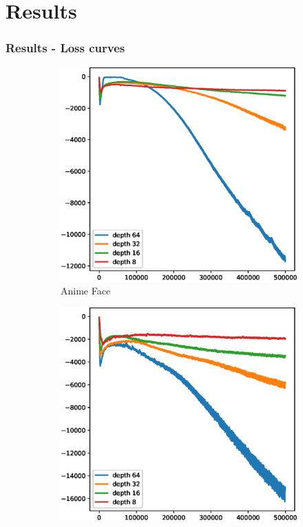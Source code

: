 \section{Results}

\begin{frame}
    \frametitle{Results - Loss curves}

    \begin{center}
        
        \begin{figure}[H]
            \centering
            \begin{subfigure}[b]{0.45\textwidth}
                \centering
                \includegraphics[width=\textwidth]{resources/images/celeba_hq_d_loss.eps}
                \caption{Anime Face}
                \label{fig:celeba_hq_d_loss}
            \end{subfigure}
            \hfill
            \begin{subfigure}[b]{0.45\textwidth}
                \centering
                \includegraphics[width=\textwidth]{resources/images/anime_face_d_loss.eps}

\end{subfigure}
\end{figure}
\end{center}
\end{frame}
